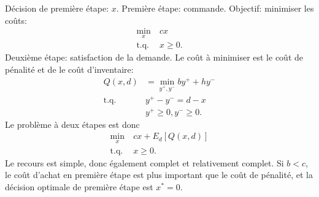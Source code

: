 \documentclass[12pt]{book}
\begin{document}
\begin{enumerate}
Décision de première étape: $x$. Première étape: commande. Objectif: minimiser les coûts:
\begin{align*}
\min_x \ & c x \\
\mbox{t.q. } & x \geq 0.
\end{align*}
Deuxième étape: satisfaction de la demande. Le coût à minimiser est le coût de pénalité et de le coût d'inventaire:
\begin{align*}
Q(x,d) &= \min_{y^+, y^-} by^+ + hy^- \\
\mbox{t.q. } & y^+ - y^- = d-x\\
& y^+ \geq 0, y^- \geq 0.
\end{align*}
Le problème à deux étapes est donc
\begin{align*}
\min_x \ & c x + E_d [Q(x,d)] \\
\mbox{t.q. } & x \geq 0.
\end{align*}
Le recours est simple, donc également complet et relativement complet.
Si $b < c$, le coût d'achat en première étape est plus important que le coût de pénalité, et la décision optimale de première étape est $x^* = 0$.


\end{enumerate}
\end{document}
